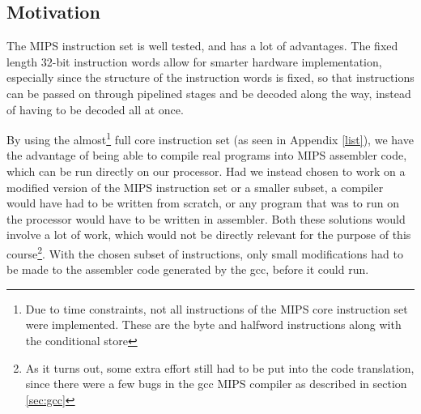 
\subsection{Motivation}
The MIPS instruction set is well tested, and has a lot of advantages. The fixed length 32-bit instruction words allow for smarter hardware implementation, especially since the structure of the instruction words is fixed, so that instructions can be passed on through pipelined stages and be decoded along the way, instead of having to be decoded all at once.

By using the almost\footnote{Due to time constraints, not all instructions of the MIPS core instruction set were implemented. These are the byte and halfword instructions along with the conditional store} full core instruction set (as seen in Appendix \ref{list}), we have the advantage of being able to compile real programs into MIPS assembler code, which can be run directly on our processor. Had we instead chosen to work on a modified version of the MIPS instruction set or a smaller subset, a compiler would have had to be written from scratch, or any program that was to run on the processor would have to be written in assembler. Both these solutions would involve a lot of work, which would not be directly relevant for the purpose of this course\footnote{As it turns out, some extra effort still had to be put into the code translation, since there were a few bugs in the gcc MIPS compiler as described in section \ref{sec:gcc}}. With the chosen subset of instructions, only small modifications had to be made to the assembler code generated by the gcc, before it could run.

